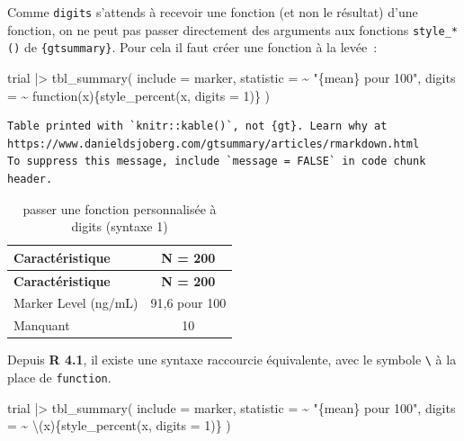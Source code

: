 \documentclass[
  letterpaper,
  DIV=11,
  numbers=noendperiod,
  oneside]{scrreprt}
\newenvironment{Shaded}{\begin{snugshade}}{\end{snugshade}}
\newcommand{\AttributeTok}[1]{\textcolor[rgb]{0.40,0.45,0.13}{#1}}
\newcommand{\ControlFlowTok}[1]{\textcolor[rgb]{0.00,0.23,0.31}{#1}}
\newcommand{\DecValTok}[1]{\textcolor[rgb]{0.68,0.00,0.00}{#1}}
\newcommand{\FunctionTok}[1]{\textcolor[rgb]{0.28,0.35,0.67}{#1}}
\newcommand{\NormalTok}[1]{\textcolor[rgb]{0.00,0.23,0.31}{#1}}
\newcommand{\SpecialCharTok}[1]{\textcolor[rgb]{0.37,0.37,0.37}{#1}}
\newcommand{\StringTok}[1]{\textcolor[rgb]{0.13,0.47,0.30}{#1}}
\begin{document}
Comme \texttt{digits} s'attends à recevoir une fonction (et non le
résultat) d'une fonction, on ne peut pas passer directement des
arguments aux fonctions \texttt{style\_*()} de \texttt{\{gtsummary\}}.
Pour cela il faut créer une fonction à la levée~:

\begin{Shaded}
\begin{Highlighting}[]
\NormalTok{trial }\SpecialCharTok{|\textgreater{}}
  \FunctionTok{tbl\_summary}\NormalTok{(}
    \AttributeTok{include =}\NormalTok{ marker,}
    \AttributeTok{statistic =} \SpecialCharTok{\textasciitilde{}} \StringTok{"\{mean\} pour 100"}\NormalTok{,}
    \AttributeTok{digits =} \SpecialCharTok{\textasciitilde{}} \ControlFlowTok{function}\NormalTok{(x)\{}\FunctionTok{style\_percent}\NormalTok{(x, }\AttributeTok{digits =} \DecValTok{1}\NormalTok{)\}}
\NormalTok{  )}
\end{Highlighting}
\end{Shaded}

\begin{verbatim}
Table printed with `knitr::kable()`, not {gt}. Learn why at
https://www.danieldsjoberg.com/gtsummary/articles/rmarkdown.html
To suppress this message, include `message = FALSE` in code chunk header.
\end{verbatim}

\hypertarget{tbl-digits-3}{}
\begin{longtable}[]{@{}lc@{}}
\caption{\label{tbl-digits-3}passer une fonction personnalisée à digits
(syntaxe 1)}\tabularnewline
\toprule()
\textbf{Caractéristique} & \textbf{N = 200} \\
\midrule()
\endfirsthead
\toprule()
\textbf{Caractéristique} & \textbf{N = 200} \\
\midrule()
\endhead
Marker Level (ng/mL) & 91,6 pour 100 \\
Manquant & 10 \\
\bottomrule()
\end{longtable}

Depuis \textbf{R 4.1}, il existe une syntaxe raccourcie équivalente,
avec le symbole \texttt{\textbackslash{}} à la place de
\texttt{function}.

\begin{Shaded}
\begin{Highlighting}[]
\NormalTok{trial }\SpecialCharTok{|\textgreater{}}
  \FunctionTok{tbl\_summary}\NormalTok{(}
    \AttributeTok{include =}\NormalTok{ marker,}
    \AttributeTok{statistic =} \SpecialCharTok{\textasciitilde{}} \StringTok{"\{mean\} pour 100"}\NormalTok{,}
    \AttributeTok{digits =} \SpecialCharTok{\textasciitilde{}}\NormalTok{ \textbackslash{}(x)\{}\FunctionTok{style\_percent}\NormalTok{(x, }\AttributeTok{digits =} \DecValTok{1}\NormalTok{)\}}
\NormalTok{  )}
\end{Highlighting}
\end{Shaded}
\end{document}
